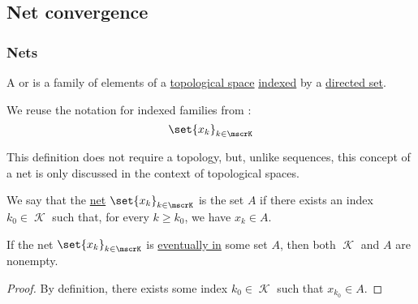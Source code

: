 \subsection{Net convergence}\label{subsec:net_convergence}

\subsubsection{Nets}

\begin{definition}\label{def:topological_net}
  A  or  is a family of elements of a \hyperref[def:topological_space]{topological space} \hyperref[def:cartesian_product/indexed_family]{indexed} by a \hyperref[def:directed_set]{directed set}.

  We reuse the notation for indexed families from :
  \begin{equation*}
    \set{ x_k }_{k \in \mscrK}
  \end{equation*}
\end{definition}
\begin{comments}
  \item This definition does not require a topology, but, unlike sequences, this concept of a net is only discussed in the context of topological spaces.
\end{comments}

\begin{definition}\label{def:net_eventually_in}
  We say that the \hyperref[def:topological_net]{net} \( \set{ x_k }_{k \in \mscrK} \) is  the set \( A \) if there exists an index \( k_0 \in \mscrK \) such that, for every \( k \geq k_0 \), we have \( x_k \in A \).
\end{definition}

\begin{proposition}\label{thm:eventually_in_implies_nonempty}
  If the net \( \set{ x_k }_{k \in \mscrK} \) is \hyperref[def:net_eventually_in]{eventually in} some set \( A \), then both \( \mscrK \) and \( A \) are nonempty.
\end{proposition}
\begin{proof}
  By definition, there exists some index \( k_0 \in \mscrK \) such that \( x_{k_0} \in A \).
\end{proof}


